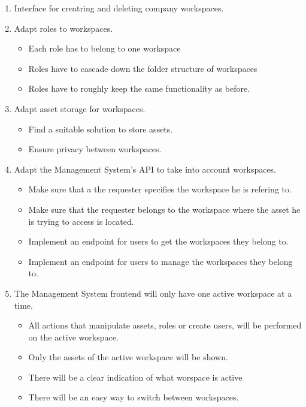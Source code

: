 \begin{enumerate}
    \item Interface for creatring and deleting company workspaces.
    
    \item Adapt roles to workspaces.
    \begin{itemize}
        \item Each role has to belong to one workspace
        \item Roles have to cascade down the folder structure of workspaces
        \item Roles have to roughly keep the same functionality as before.
    \end{itemize}
    
    \item Adapt asset storage for workspaces.
    \begin{itemize}
        \item Find a suitable solution to store assets.
        \item Ensure privacy between workspaces.
    \end{itemize}
    
    \item Adapt the Management System's API to take into account workspaces.
    \begin{itemize}
        \item Make sure that a the requester specifies the workspace he is refering to.
        \item Make sure that the requester belongs to the workspace where the asset he is trying to access is located.
        \item Implement an endpoint for users to get the workspaces they belong to.
        \item Implement an endpoint for users to manage the workspaces they belong to.
    \end{itemize}
    
    \item The Management System frontend will only have one active workspace at a time.
    \begin{itemize}
        \item All actions that manipulate assets, roles or create users, will be performed on the active workspace.
        \item Only the assets of the active workspace will be shown.
        \item There will be a clear indication of what worspace is active
        \item There will be an easy way to switch between workspaces.
    \end{itemize}
    

\end{enumerate}
